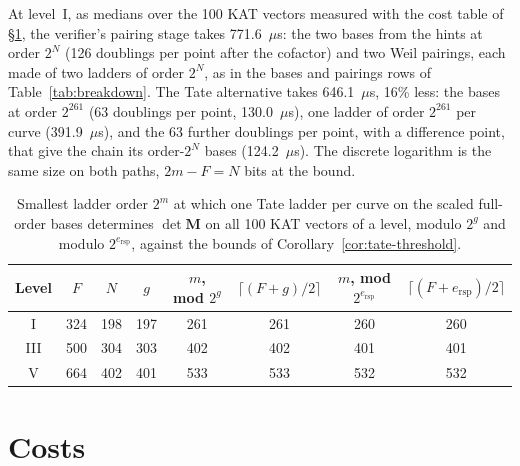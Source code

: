 \documentclass[version=submission]{iacrcc}
\newcommand{\ers}{e_{\mathrm{rsp}}}
\newcommand{\Mm}{\mathbf{M}}
\begin{document}
At level~I, as medians over the 100 KAT vectors measured with the cost table of \S\ref{sec:cost}, the verifier's pairing stage takes 771.6~$\mu$s: the two bases from the hints at order $2^N$ (126 doublings per point after the cofactor) and two Weil pairings, each made of two ladders of order $2^N$, as in the bases and pairings rows of Table~\ref{tab:breakdown}. The Tate alternative takes 646.1~$\mu$s, 16\% less: the bases at order $2^{261}$ (63 doublings per point, 130.0~$\mu$s), one ladder of order $2^{261}$ per curve (391.9~$\mu$s), and the 63 further doublings per point, with a difference point, that give the chain its order-$2^N$ bases (124.2~$\mu$s).
The discrete logarithm is the same size on both paths, $2m - F = N$ bits
at the bound.

\begin{table}[H]
\centering
\caption{Smallest ladder order $2^m$ at which one Tate ladder per curve on
the scaled full-order bases determines $\det \Mm$ on all 100 KAT vectors
of a level, modulo $2^g$ and modulo $2^{\ers}$, against the bounds of
Corollary~\ref{cor:tate-threshold}.}
\label{tab:threshold}
\footnotesize
\setlength{\tabcolsep}{4pt}
\begin{tabular}{c c c c c c c c}
\toprule
\textbf{Level} & $F$ & $N$ & $g$ & $m$, mod $2^g$ & $\lceil (F + g)/2 \rceil$ & $m$, mod $2^{\ers}$ & $\lceil (F + \ers)/2 \rceil$ \\
\midrule
I   & 324 & 198 & 197 & 261 & 261 & 260 & 260 \\
III & 500 & 304 & 303 & 402 & 402 & 401 & 401 \\
V   & 664 & 402 & 401 & 533 & 533 & 532 & 532 \\
\bottomrule
\end{tabular}
\end{table}

\section{Costs}
\label{sec:cost}
\end{document}
